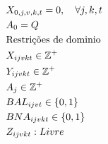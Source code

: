 \begin{align}
	 & X_{0,j,v,k,t} = 0,     \quad \forall j,k,t                                                                                                                                                                     \label{eq: m1_ini_assig}                   \\
	 & A_{0} = Q                                                                                                                                                                                                      \label{eq: m1_ini_disponi}                 \\
	 & \text{Restrições de dominio}  \notag                                                                                                                                                                                                                      \\
	 & X_{ijvkt} \in \mathbb{Z}^+                                                                                                                                                                                     \label{eq: m1_dom_assig}                   \\
	 & Y_{ijvkt} \in \mathbb{Z}^+                                                                                                                                                                                     \label{eq: m1_dom_autho}                   \\
	 & A_{j} \in \mathbb{Z}^+                                                                                                                                                                                         \label{eq: m1_dom_disponi}                 \\
	 & BAL_{ijvt} \in \{0,1\}                                                                                                                                                                                    \label{eq: m1_dom_bin_all}                      \\
	 & BNA_{ijvkt} \in \{0,1\}                                                                                                                                                                                   \label{eq: m1_dom_bin_nadja}                    \\
	 & Z_{ijvkt} : Livre                                                                                                                                                                                     \label{eq: m1_dom_bin_true_last_value}
\end{align}


